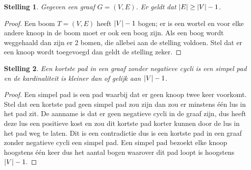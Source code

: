 \documentclass[conference]{IEEEtran}
\newtheorem{theorem}{Stelling}[section]
\theoremstyle{definition}
\theoremstyle{remark}
\DeclarePairedDelimiter{\card}{\vert}{\vert}  %
\begin{document}
\printbibliography

\appendix \label{appendix:stellingen}
\begin{theorem}
    Gegeven een graaf $G = (V, E)$. Er geldt dat $\card{E} \geq \card{V} - 1$.
\end{theorem}
\begin{proof}
    Een boom $T = (V, E)$ heeft $\card{V} - 1$ bogen; er is een wortel en voor elke andere knoop in de boom moet er ook een boog zijn. Als een boog wordt weggehaald dan zijn er 2 bomen, die allebei aan de stelling voldoen. Stel dat er een knoop wordt toegevoegd dan geldt de stelling zeker.
\end{proof}
\begin{theorem} \label{appendix:aantalBogenInKortstePad}
    Een kortste pad in een graaf zonder negatieve cycli is een simpel pad en de kardinaliteit is kleiner dan of gelijk aan $\card{V} - 1$.
\end{theorem}
\begin{proof}
    Een simpel pad is een pad waarbij dat er geen knoop twee keer voorkomt. Stel dat een kortste pad geen simpel pad zou zijn dan zou er minstens één lus in het pad zit. De aanname is dat er geen negatieve cycli in de graaf zijn, dus heeft deze lus een positieve kost en zou dit kortste pad korter kunnen door de lus in het pad weg te laten. Dit is een contradictie dus is een kortste pad in een graaf zonder negatieve cycli een simpel pad. Een simpel pad bezoekt elke knoop hoogstens één keer dus het aantal bogen waarover dit pad loopt is hoogstens $\card{V} - 1$.
\end{proof}
\end{document}
